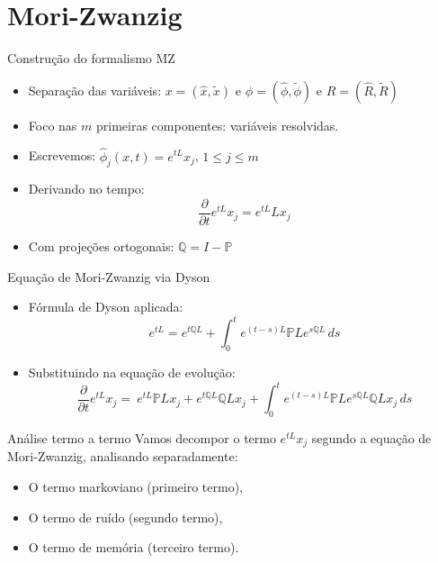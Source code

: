 \section{Mori-Zwanzig}

\begin{frame}{Construção do formalismo MZ}
\begin{itemize}
    \item Separação das variáveis: $x = (\hat{x}, \tilde{x})$ e $\phi = (\hat{\phi}, \tilde{\phi})$ e $R = (\hat{R}, \tilde{R})$
    \item Foco nas $m$ primeiras componentes: variáveis resolvidas.
    \item Escrevemos: $\hat{\phi}_j(x,t) = e^{tL}x_j$, $1 \leq j \leq m$
    \item Derivando no tempo:
    \begin{equation*}
        \frac{\partial}{\partial t}e^{tL}x_j = e^{tL}Lx_j
    \end{equation*}
    \item Com projeções ortogonais: $\mathbb{Q} = I - \mathbb{P}$
\end{itemize}
\end{frame}


\begin{frame}{Equação de Mori-Zwanzig via Dyson}
\begin{itemize}
    \item Fórmula de Dyson aplicada:
    \begin{equation*}
        e^{tL} = e^{t\mathbb{Q}L} + \int_0^t e^{(t-s)L} \mathbb{P}L e^{s\mathbb{Q}L} \, ds
    \end{equation*}
    \item Substituindo na equação de evolução:
    \begin{equation*}
        \frac{\partial}{\partial t} e^{tL} x_j = \ e^{tL} \mathbb{P}L x_j + e^{t\mathbb{Q}L} \mathbb{Q}L x_j + \int_0^t e^{(t-s)L} \mathbb{P}L e^{s\mathbb{Q}L} \mathbb{Q}L x_j \, ds
    \end{equation*}
\end{itemize}
\end{frame}


\begin{frame}{Análise termo a termo}
    Vamos decompor o termo $e^{tL} x_j$ segundo a equação de Mori-Zwanzig, analisando separadamente:
    \begin{itemize}
        \item O termo markoviano (primeiro termo),
        \item O termo de ruído (segundo termo),
        \item O termo de memória (terceiro termo).
    \end{itemize}
\end{frame}

